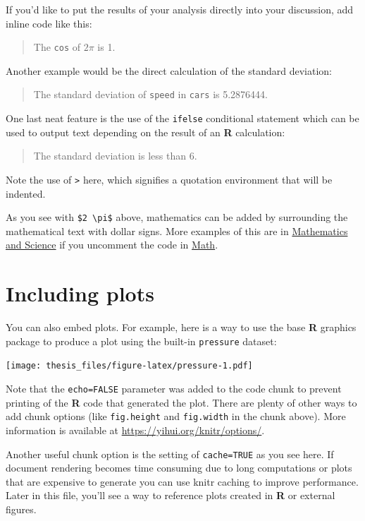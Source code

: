 \documentclass[12pt,twoside]{reedthesis}
\begin{document}
If you'd like to put the results of your analysis directly into your discussion, add inline code like this:
\begin{quote}
The \texttt{cos} of \(2 \pi\) is 1.
\end{quote}
Another example would be the direct calculation of the standard deviation:
\begin{quote}
The standard deviation of \texttt{speed} in \texttt{cars} is 5.2876444.
\end{quote}
One last neat feature is the use of the \texttt{ifelse} conditional statement which can be used to output text depending on the result of an \textbf{R} calculation:
\begin{quote}
The standard deviation is less than 6.
\end{quote}
Note the use of \texttt{\textgreater{}} here, which signifies a quotation environment that will be indented.

As you see with \texttt{\$2\ \textbackslash{}pi\$} above, mathematics can be added by surrounding the mathematical text with dollar signs. More examples of this are in \protect\hyperlink{math-sci}{Mathematics and Science} if you uncomment the code in \protect\hyperlink{math}{Math}.

\hypertarget{including-plots}{%
\section{Including plots}\label{including-plots}}

You can also embed plots. For example, here is a way to use the base \textbf{R} graphics package to produce a plot using the built-in \texttt{pressure} dataset:

\texttt{[image: thesis\_files/figure-latex/pressure-1.pdf]}

Note that the \texttt{echo=FALSE} parameter was added to the code chunk to prevent printing of the \textbf{R} code that generated the plot. There are plenty of other ways to add chunk options (like \texttt{fig.height} and \texttt{fig.width} in the chunk above). More information is available at \url{https://yihui.org/knitr/options/}.

Another useful chunk option is the setting of \texttt{cache=TRUE} as you see here. If document rendering becomes time consuming due to long computations or plots that are expensive to generate you can use knitr caching to improve performance. Later in this file, you'll see a way to reference plots created in \textbf{R} or external figures.
\end{document}
